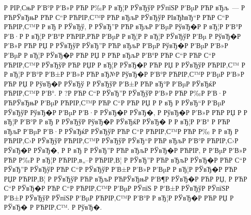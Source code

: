 \documentclass[a4paper,14pt]{extarticle}
\begin{document}
Р  РІР‚СњР  Р’В°Р  Р’В»Р РЋР Р‰Р  Р вЂ¦Р  РЎвЂўР  РЎпїЅР  Р’ВµР РЋР вЂљ~--- Р РЋРЎвЂњР РЋР С“Р РЋРІР‚С™Р РЋР вЂљР  РЎвЂўР  РІвЂћвЂ“Р РЋР С“Р РЋРІР‚С™Р  Р вЂ Р  РЎвЂў, Р  РЎвЂ”Р РЋР вЂљР  Р’ВµР  РўвЂ�Р  Р вЂ¦Р  Р’В°Р  Р’В·Р  Р вЂ¦Р  Р’В°Р РЋРІР‚РЋР  Р’ВµР  Р вЂ¦Р  Р вЂ¦Р  РЎвЂўР  Р’Вµ Р  РўвЂ�Р  Р’В»Р РЋР РЏ Р  РЎвЂўР  РЎвЂ”Р РЋР вЂљР  Р’ВµР  РўвЂ�Р  Р’ВµР  Р’В»Р  Р’ВµР  Р вЂ¦Р  РЎвЂ�Р РЋР РЏ Р РЋР вЂљР  Р’В°Р РЋР С“Р РЋР С“Р РЋРІР‚С™Р  РЎвЂўР РЋР РЏР  Р вЂ¦Р  РЎвЂ�Р РЋР РЏ Р  РЎвЂўР РЋРІР‚С™ Р  Р вЂ¦Р  Р’В°Р  Р’В±Р  Р’В»Р РЋР вЂ№Р  РўвЂ�Р  Р’В°Р РЋРІР‚С™Р  Р’ВµР  Р’В»Р РЋР РЏ Р  РўвЂ�Р  РЎвЂў Р  РЎвЂўР  Р’В±Р РЋР вЂ°Р  Р’ВµР  РЎвЂќР РЋРІР‚С™Р  Р’В°. Р  ?Р РЋР С“Р  РЎвЂ”Р  РЎвЂўР  Р’В»Р РЋР Р‰Р  Р’В·Р РЋРЎвЂњР  Р’ВµР РЋРІР‚С™Р РЋР С“Р РЋР РЏ Р  Р вЂ  Р  РЎвЂ“Р  Р’ВµР  РЎвЂўР  РўвЂ�Р  Р’ВµР  Р’В·Р  РЎвЂ�Р  РЎвЂ�, Р  РўвЂ�Р  Р’В»Р РЋР РЏ Р  Р вЂ¦Р  Р’В°Р  Р вЂ Р  РЎвЂўР  РўвЂ�Р  РЎвЂќР  РЎвЂ� Р  Р вЂ¦Р  Р’В° Р РЋР вЂљР  Р’ВµР  Р’В·Р  РЎвЂќР  РЎвЂўР РЋР С“Р РЋРІР‚С™Р РЋР Р‰ Р  Р вЂ  Р РЋРІР‚С›Р  РЎвЂўР РЋРІР‚С™Р  РЎвЂўР  РЎвЂ“Р РЋР вЂљР  Р’В°Р РЋРІР‚С›Р  РЎвЂ�Р  РЎвЂ�, Р  Р вЂ  Р  РЎвЂ”Р РЋР вЂљР  РЎвЂ�Р РЋРІР‚ Р  Р’ВµР  Р’В»Р РЋР Р‰Р  Р вЂ¦Р РЋРІР‚в„–Р РЋРІР‚В¦ Р  РЎвЂ”Р РЋР вЂљР  РЎвЂ�Р РЋР С“Р  РЎвЂ”Р  РЎвЂўР РЋР С“Р  РЎвЂўР  Р’В±Р  Р’В»Р  Р’ВµР  Р вЂ¦Р  РЎвЂ�Р РЋР РЏР РЋРІР‚В¦ Р  РЎвЂўР РЋР вЂљР РЋРЎвЂњР  Р’В¶Р  РЎвЂ�Р РЋР РЏ, Р РЋР С“Р  РЎвЂ�Р РЋР С“Р РЋРІР‚С™Р  Р’ВµР  РЎпїЅ Р  Р’В±Р  РЎвЂўР  РЎпїЅР  Р’В±Р  РЎвЂўР  РЎпїЅР  Р’ВµР РЋРІР‚С™Р  Р’В°Р  Р вЂ¦Р  РЎвЂ�Р РЋР РЏ Р  РЎвЂ� Р РЋРІР‚С™. Р  РўвЂ�.
 
\end{document}
